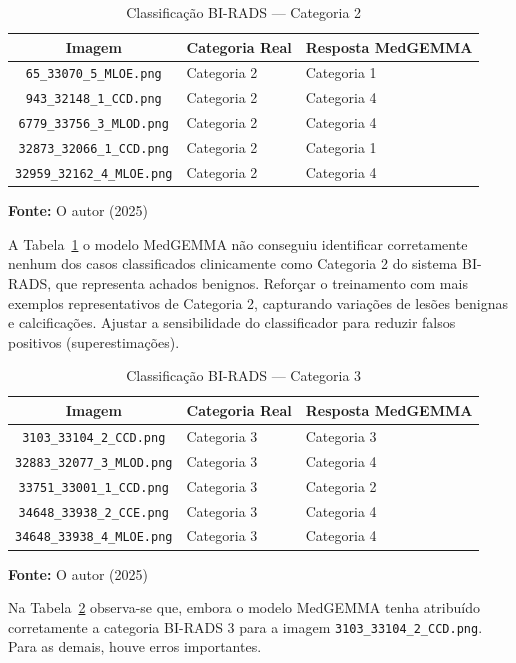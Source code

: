 \documentclass[12pt]{article}
\begin{document}
\begin{table}[!h]
\renewcommand{\arraystretch}{1.3}
\caption{Classificação BI-RADS — Categoria 2}
\label{table:birads_categoria2}
\centering
\begin{tabular}{|c|l|p{4.5cm}|}
\hline
\textbf{Imagem} & \textbf{Categoria Real} & \textbf{Resposta MedGEMMA} \\
\hline
\texttt{65\_33070\_5\_MLOE.png} & Categoria 2 & Categoria 1 \\
\hline
\texttt{943\_32148\_1\_CCD.png} & Categoria 2 & Categoria 4 \\
\hline
\texttt{6779\_33756\_3\_MLOD.png} & Categoria 2 & Categoria 4 \\
\hline
\texttt{32873\_32066\_1\_CCD.png} & Categoria 2 & Categoria 1 \\
\hline
\texttt{32959\_32162\_4\_MLOE.png} & Categoria 2 & Categoria 4 \\
\hline
\end{tabular}

\vspace{0.2cm}
\small \textbf{Fonte:} O autor (2025)
\end{table}
A Tabela~\ref{table:birads_categoria2} o modelo MedGEMMA não conseguiu identificar corretamente nenhum dos casos classificados clinicamente como Categoria 2 do sistema BI-RADS, que representa achados benignos. Reforçar o treinamento com mais exemplos representativos de Categoria 2, capturando variações de lesões benignas e calcificações. 
Ajustar a sensibilidade do classificador para reduzir falsos positivos (superestimações).

\begin{table}[!h]
\renewcommand{\arraystretch}{1.3}
\caption{Classificação BI-RADS — Categoria 3}
\label{table:birads_categoria3}
\centering
\begin{tabular}{|c|l|p{4.5cm}|}
\hline
\textbf{Imagem} & \textbf{Categoria Real} & \textbf{Resposta MedGEMMA} \\
\hline
\texttt{3103\_33104\_2\_CCD.png} & Categoria 3 & Categoria 3 \\
\hline
\texttt{32883\_32077\_3\_MLOD.png} & Categoria 3 & Categoria 4 \\
\hline
\texttt{33751\_33001\_1\_CCD.png} & Categoria 3 & Categoria 2 \\
\hline
\texttt{34648\_33938\_2\_CCE.png} & Categoria 3 & Categoria 4 \\
\hline
\texttt{34648\_33938\_4\_MLOE.png} & Categoria 3 & Categoria 4 \\
\hline
\end{tabular}

\vspace{0.2cm}
\small \textbf{Fonte:} O autor (2025)
\end{table}
Na Tabela~\ref{table:birads_categoria3} observa-se que, embora o modelo MedGEMMA tenha atribuído corretamente a categoria BI-RADS 3 para a imagem \texttt{3103\_33104\_2\_CCD.png}. Para as demais, houve erros importantes.  
\end{document}

